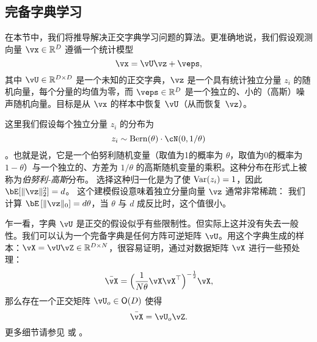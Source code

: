\documentclass[../../book-main_zh.tex]{subfiles}
\begin{document}
\subsection{完备字典学习}
\label{sec:complete-dictionary}

在本节中，我们将推导解决正交字典学习问题的算法。更准确地说，我们假设观测向量 $\vx \in \R^D$ 遵循一个统计模型
\begin{equation}
    \vx = \vU \vz + \veps, 
    \label{eq:ica-model-ch2}
\end{equation}
其中 $\vU \in \R^{D \times D}$ 是一个未知的正交字典，$\vz$ 是一个具有统计独立分量 $z_i$ 的随机向量，每个分量的均值为零，而 $\veps \in \R^D$ 是一个独立的、小的（高斯）噪声随机向量。目标是从 $\vx$ 的样本中恢复 $\vU$（从而恢复 $\vz$）。

这里我们假设每个独立分量 $z_i$ 的分布为 $$z_i \sim \mathrm{Bern}(\theta) \cdot \cN(0, 1/\theta)$$。也就是说，它是一个伯努利随机变量（取值为1的概率为 $\theta$，取值为0的概率为 $1-\theta$）与一个独立的、方差为 $1/\theta$ 的高斯随机变量的乘积。这种分布在形式上被称为\textit{伯努利-高斯}分布。
选择这种归一化是为了使 $\operatorname{Var}(z_i) = 1$，因此 $\bE[\norm{\vz}_2^2]=d$。
这个建模假设意味着独立分量向量 $\vz$ 通常非常稀疏：
我们计算 $\bE\left[\norm{\vz}_0\right] = d\theta$，当 $\theta$ 与 $d$ 成反比时，这个值很小。

\begin{remark}[正交假设] 
乍一看，字典 $\vU$ 是正交的假设似乎有些限制性。但实际上这并没有失去一般性。我们可以认为一个完备字典是任何方阵可逆矩阵 $\vU$。用这个字典生成的样本：$\vX = \vU \vZ \in \mathbb{R}^{D\times N}$，很容易证明，通过对数据矩阵 $\vX$ 进行一些预处理：
\begin{equation}
    \bar{\vX} = \Big(\frac{1}{N\theta} \vX\vX^\top\Big)^{-\frac{1}{2}}\vX,
\end{equation}
那么存在一个正交矩阵 $\vU_{o} \in \O(D)$ 使得
\begin{equation}
    \bar{\vX} = \vU_{o}\vZ.
\end{equation}
    更多细节请参见  或 \cite{sun2017completeI}。
\end{remark}
\end{document}
